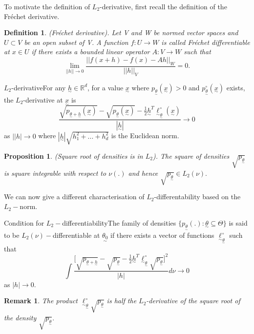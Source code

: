 \documentclass[twoside]{article}
\newtheorem{proposition}[theorem]{Proposition}
\newtheorem{definition}[theorem]{Definition}
\newtheorem{remark}[theorem]{Remark}
\newcommand{\utilde}{\underset{\sim}}
\begin{document}
To motivate the definition of $L_2$-derivative, first recall the definition of the Fréchet derivative.
\begin{definition}(Fréchet derivative). Let V and W be normed vector spaces and $U \subset V$ be an open subset of V. A function $f: U \rightarrow W$ is called Fréchet differentiable at $x \in U$ if there exists a bounded linear operator $A: V \rightarrow W$ such that 
$$
\lim_{||h|| \rightarrow 0}\frac{||f(x + h) - f(x) - Ah ||_W}{||h||_V} = 0.
$$
\end{definition}

\begin{definition_exam}{$L_2$-derivative}{}For any $\utilde{h} \in \mathbb{R}^d$, for a value $\utilde{x}$ where $p_{\utilde{\theta}}(\utilde{x}) > 0$ and $p_{\utilde{\theta}}^{\circ}(\utilde{x})$ exists, the $L_2$-derivative at $\utilde{x}$ is 
$$
\frac{\sqrt{p_{\utilde{\theta} + \utilde{h}}(\utilde{x})} - \sqrt{p_{\utilde{\theta}}(\utilde{x})} - \frac{1}{2}\utilde{h}^T\utilde{\ell}_{\utilde{\theta}}^{\circ}(\utilde{x}) }{|\utilde{h}|} \rightarrow 0
$$
as $||h| \rightarrow 0$ where $|\utilde{h}| \sqrt{h_1^2 + ... + h_d^2}$ is the Euclidean norm.
\end{definition_exam}

\begin{proposition}(Square root of densities is in $L_2$). The square of densities $\sqrt{p_{\utilde{\theta}}}$ is square integrable with respect to $\nu(.)$ and hence $\sqrt{p_{\utilde{\theta}}} \in L_2(\nu).$
\end{proposition}

We can now give a different characterisation of $L_2$-differentability based on the $L_2-$norm.

\begin{proposition_exam}{Condition for $L_2-$differentiability}{}The family of densities $\{p_{\utilde{\theta}}(.): \utilde{\theta} \subseteq \Theta\}$ is said to be $L_2(\nu)-$differentiable at $\utilde{\theta_0}$ if there exists a vector of functions $\utilde{\ell}_{\utilde{\theta}}^{\circ}$ such that 
$$
\int \frac{\bigg[\sqrt{p_{\utilde{\theta} + \utilde{h}}} - \sqrt{p_{\utilde{\theta}}} - \frac{1}{2}\utilde{h}^T \utilde{\ell}_{\utilde{\theta}}^{\circ}\sqrt{p_{\utilde{\theta}}} \bigg]^2}{|h|}d\nu \rightarrow 0
$$
as $|h| \rightarrow 0.$
\end{proposition_exam}

\begin{remark}
The product $\utilde{\ell}_{\utilde{\theta}}^{\circ}\sqrt{p_{\utilde{\theta}}}$ is half the $L_2$-derivative of the square root of the density $\sqrt{p_{\utilde{\theta}}}.$
\end{remark}
\end{document}

